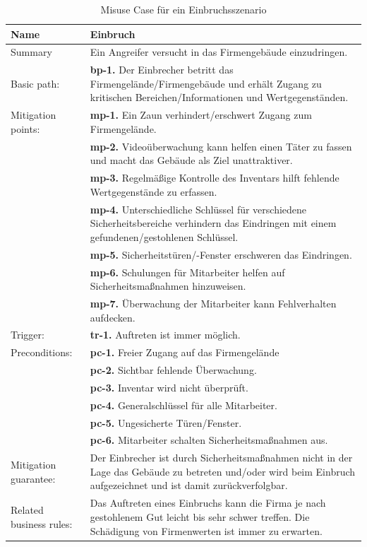 \begin{table}
\scriptsize
\centering
\caption{Misuse Case für ein Einbruchsszenario}
\label{tab:MisuseCaseEinbruch}
\begin{tabular}{p{}p{}}
\hline 
Name & Einbruch \\ 
\hline 
Summary & Ein Angreifer versucht in das Firmengebäude einzudringen.\\
\hline
Basic path: & \textbf{bp-1.} Der Einbrecher betritt das Firmengelände/Firmengebäude und erhält Zugang zu kritischen Bereichen/Informationen und Wertgegenständen. \\ 
\hline 
Mitigation points: & \textbf{mp-1.} Ein Zaun verhindert/erschwert Zugang zum Firmengelände. \\ 
& \textbf{mp-2.} Videoüberwachung kann helfen einen Täter zu fassen und macht das Gebäude als Ziel unattraktiver.\\
& \textbf{mp-3.} Regelmäßige Kontrolle des Inventars hilft fehlende Wertgegenstände zu erfassen.\\
& \textbf{mp-4.} Unterschiedliche Schlüssel für verschiedene Sicherheitsbereiche verhindern das Eindringen mit einem gefundenen/gestohlenen Schlüssel.\\
& \textbf{mp-5.} Sicherheitstüren/-Fenster erschweren das Eindringen.\\
& \textbf{mp-6.} Schulungen für Mitarbeiter helfen auf Sicherheitsmaßnahmen hinzuweisen.\\
& \textbf{mp-7.} Überwachung der Mitarbeiter kann Fehlverhalten aufdecken.\\
\hline 
Trigger: & \textbf{tr-1.} Auftreten ist immer möglich. \\ 
\hline 
Preconditions: & \textbf{pc-1.} Freier Zugang auf das Firmengelände \\ 
& \textbf{pc-2.} Sichtbar fehlende Überwachung.\\
& \textbf{pc-3.} Inventar wird nicht überprüft.\\
& \textbf{pc-4.} Generalschlüssel für alle Mitarbeiter.\\
& \textbf{pc-5.} Ungesicherte Türen/Fenster.\\
& \textbf{pc-6.} Mitarbeiter schalten Sicherheitsmaßnahmen aus.\\
\hline 
Mitigation guarantee: & Der Einbrecher ist durch Sicherheitsmaßnahmen nicht in der Lage das Gebäude zu betreten und/oder wird beim Einbruch aufgezeichnet und ist damit zurückverfolgbar.\\ 
\hline 
Related business rules: & Das Auftreten eines Einbruchs kann die Firma je nach gestohlenem Gut leicht bis sehr schwer treffen. Die Schädigung von Firmenwerten ist immer zu erwarten.\\ 

\end{tabular}
\end{table}
